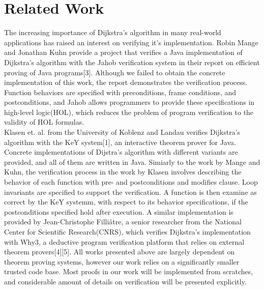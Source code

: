 
\section{Related Work}
The increasing importance of Dijkstra's algorithm in many real-world applications has raised an interest on verifying it's implementation. Robin Mange and Jonathan Kuhn provide a project that verifies a Java implementation of Dijkstra's algorithm with the Jahob verification system in their report on efficient proving of Java programs[3]. Although we failed to obtain the concrete implementation of this work, the report demonstrates the verification process. Function behaviors are specified with preconditions, frame conditions, and postconditions, and Jahob allows programmers to provide these specifications in high-level logic(HOL), which reduces the problem of program verification to the validity of HOL formulas. 
\\

Klasen et. al. from the University of Koblenz and Landau verifies Dijkstra's algorithm with the KeY system[1], an interactive theorem prover for Java. Concrete implementations of Dijstra's algorithm with different variants are provided, and all of them are written in Java. Simiarly to the work by Mange and Kuhn, the verification process in the work by Klasen involves describing the behavior of each function with pre- and postconditions and modifies clause. Loop invariants are specified to support the verification. A function is then examine as correct by the KeY systemm, with respect to its behavior specifications, if the postconditions specified hold after execution. A similar implementation is provided by Jean-Christophe Filliâtre, a senior researcher from the National Center for Scientific Research(CNRS), which verifies Dijkstra's implementation with Why3, a deductive program verification platform that relies on external theorem provers[4][5]. All works presented above are largely dependent on theorem proving systems, however our work relies on a significantly smaller trusted code base. Most proofs in our work will be implemented from scratches, and considerable amount of details on verification will be presented explicitly.
\\

